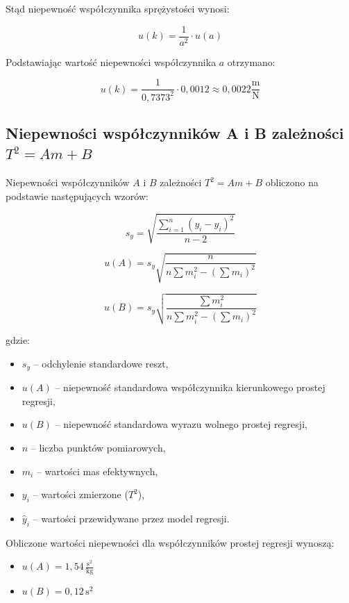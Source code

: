 \documentclass[a4paper,12pt]{article}
\begin{document}
Stąd niepewność współczynnika sprężystości wynosi:

\begin{equation*}
    u(k) =  \frac{1}{a^2} \cdot u(a)
\end{equation*}

Podstawiając wartość niepewności współczynnika $a$ otrzymano:

\begin{equation*}
    u(k) =  \frac{1}{0,7373^2} \cdot 0,0012 \approx 0,0022 \frac{\text{m}}{\text{N}}
\end{equation*}



\subsection{Niepewności współczynników A i B zależności $T^2 = Am + B$}

Niepewności współczynników $A$ i $B$ zależności $T^2 = Am + B$ obliczono na podstawie następujących wzorów:

\[
    s_y = \sqrt{\frac{\sum_{i=1}^{n} (y_i - \hat{y}_i)^2}{n-2}}
\]

\[
    u(A) = s_y \sqrt{\frac{n}{n \sum m_i^2 - \left( \sum m_i \right)^2}}
\]

\[
    u(B) = s_y \sqrt{\frac{\sum m_i^2}{n \sum m_i^2 - \left( \sum m_i \right)^2}}
\]

gdzie:
\begin{itemize}
    \setlength{\itemsep}{0em}
    \item $s_y$ -- odchylenie standardowe reszt,
    \item $u(A)$ -- niepewność standardowa współczynnika kierunkowego prostej regresji,
    \item $u(B)$ -- niepewność standardowa wyrazu wolnego prostej regresji,
    \item $n$ -- liczba punktów pomiarowych,
    \item $m_i$ -- wartości mas efektywnych,
    \item $y_i$ -- wartości zmierzone ($T^2$),
    \item $\hat{y}_i$ -- wartości przewidywane przez model regresji.
\end{itemize}

Obliczone wartości niepewności dla współczynników prostej regresji wynoszą:

\begin{itemize}
    \setlength{\itemsep}{0em}
    \item $u(A) = 1{,}54\,\frac{\text{s}^2}{\text{kg}}$
    \item $u(B) = 0{,}12\,\text{s}^2$
\end{itemize}
\end{document}

